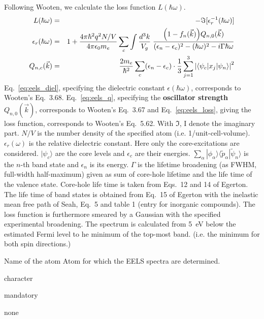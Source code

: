 \documentclass[final,12pt,makeidx,DIV=calc]{article}
\newcommand{\key}[1]{\hfill\break \makebox[1.5in][l]{\bf #1}\hfill\break}
\newcommand{\vdescr}[1]{\makebox[1in][l]{}\parbox[t]{110mm}{#1}\hfill\break}
\newcommand{\vformat}[1]{
\makebox[1in][l]{}\parbox[t]{110mm}{\makebox[1in][l]{Type:}\parbox[t]{2.7in}{#1}}
\hfill\break}
\newcommand{\vrules}[1]{
\makebox[1in][l]{}\parbox[t]{110mm}{\makebox[1in][l]{Rules:}\parbox[t]{2.7in}{#1}}
\hfill\break}
\newcommand{\vdefault}[1]{
\makebox[1in][l]{}\parbox[t]{110mm}
{\makebox[1in][l]{Default:}\parbox[t]{2.7in}{#1}}
\hfill\break}
\newcommand{\mbax}[1]{#1}
\begin{document}
Following Wooten\cite{wooten72_book}, we calculate
 the loss function $L(\hbar\omega)$.
  \begin{eqnarray}
  L(\hbar\omega)&=&-\Im[\epsilon^{-1}_r(\hbar\omega)]
\label{eq:eels_loss}
  \\
    \epsilon_r(\hbar\omega)&=&
1+\frac{4\pi\hbar^2 q^2 N/V}{4\pi\epsilon_0m_e}
\sum_c \int \frac{d^3k}{V_g}\;\frac{\Bigl(1-f_n(\vec{k})\Bigr)Q_{n,0}(\vec{k})}
{(\epsilon_{n}-\epsilon_{c})^2-(\hbar\omega)^2-i\Gamma\hbar\omega}
\label{eq:eels_diel}
\\
Q_{n,c}(\vec{k})&=&\frac{2m_e}{\hbar^2}\sum_c(\epsilon_n-\epsilon_c)
\cdot\frac{1}{3}\sum_{j=1}^3\left|\langle\psi_c|x_j|\psi_n\rangle\right|^2
\label{eq:eels_q}
  \end{eqnarray}
Eq.~\ref{eq:eels_diel}, specifying the dielectric constant
$\epsilon(\hbar\omega)$, corresponds to Wooten's Eq.~3.68.
Eq.~\ref{eq:eels_q}, specifying the \textbf{oscillator
  strength} $Q_{n,0}(\vec{k})$, corresponds
to Wooten's Eq.~3.67 and Eq.~\ref{eq:eels_loss}, giving the loss
function, corresponds to Wooten's Eq.~5.62. With $\Im$, I denote the
imaginary part. $N/V$ is the number density of the specified atom
(i.e. 1/unit-cell-volume). $\epsilon_r(\omega)$ is the relative
dielectric constant. Here only the core-excitations are considered.
$|\psi_c\rangle$ are the core levels and $\epsilon_c$ are their
energies. $\sum_\alpha|\phi_\alpha\rangle
\langle\tilde{p}_\alpha|\tilde{\psi}_n\rangle$ is the $n$-th band
state and $\epsilon_n$ is its energy. $\Gamma$ is the lifetime
broadening (as FWHM, full-width half-maximum) given as sum of
core-hole lifetime and the life time of the valence state. Core-hole
life time is taken from Eqs.~12 and 14 of
Egerton\cite{egerton07_ultramicroscopy107_565}. The life time of band
states is obtained from Eq.~15 of Egerton
\cite{egerton07_ultramicroscopy107_565} with the inelastic mean free
path of Seah\cite{seah79_surfinterfaceanal1_2}, Eq.~5 and table 1
(entry for inorganic compounds). The loss function is furthermore
smeared by a Gaussian with the specified experimental broadening.  The
spectrum is calculated from 5~eV below the estimated Fermi level to he
minimum of the top-most band. (i.e. the minimum for both spin
directions.)

\mbax{\key{ATOM} 
\vdescr{Name of the atom Atom for which the EELS spectra are determined.}
\vformat{character} 
\vrules{mandatory}
\vdefault{none}}
\end{document}
